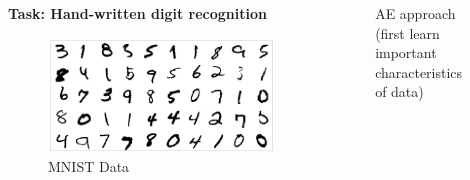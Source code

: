 \begin{frame}
  \begin{columns}

    \begin{overlayarea}{\textwidth}{\textheight}
        \vspace{0.2in}
        \textbf{\large{Task: Hand-written digit recognition}}
        \begin{figure}
            \includegraphics[scale= 0.25]{images/mnist.png}
        \caption{MNIST Data}
        \end{figure}
    \end{overlayarea}

    \begin{overlayarea}{\textwidth}{\textheight}
    \begin{figure}
            \hspace{2cm}
			
            \vspace{0.3cm}
        \caption{\small{AE approach (first learn important characteristics of data)}} 
    \end{figure}
 
    \end{overlayarea}
  \end{columns}
\end{frame}

